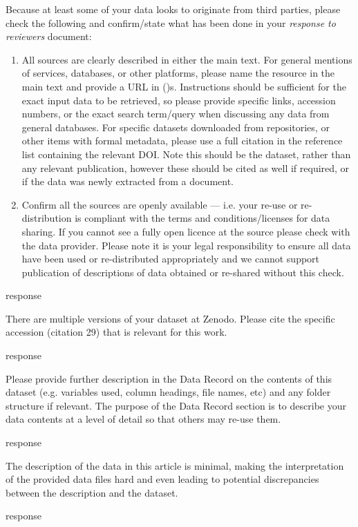 \documentclass{response}
\begin{document}
\EC Because at least some of your data looks to originate from third parties, please check the following and confirm/state what has been done in your \textit{response to reviewers} document:
\begin{enumerate}
    \item All sources are clearly described in either the main text. For general mentions of services, databases, or other platforms, please name the resource in the main text and provide a URL in ()s. Instructions should be sufficient for the exact input data to be retrieved, so please provide specific links, accession numbers, or the exact search term/query when discussing any data from general databases. For specific datasets downloaded from repositories, or other items with formal metadata, please use a full citation in the reference list containing the relevant DOI. Note this should be the dataset, rather than any relevant publication, however these should be cited as well if required, or if the data was newly extracted from a document.
    \item Confirm all the sources are openly available --- i.e. your re-use or re-distribution is compliant with the terms and conditions/licenses for data sharing. If you cannot see a fully open licence at the source please check with the data provider. Please note it is your legal responsibility to ensure all data have been used or re-distributed appropriately and we cannot support publication of descriptions of data obtained or re-shared without this check.
\end{enumerate}

\AR response

\EC There are multiple versions of your dataset at Zenodo. Please cite the specific accession (citation 29) that is relevant for this work.

\AR response

\EC Please provide further description in the Data Record on the contents of this dataset (e.g. variables used, column headings, file names, etc) and any folder structure if relevant. The purpose of the Data Record section is to describe your data contents at a level of detail so that others may re-use them.

\AR response

\EC The description of the data in this article is minimal, making the interpretation of the provided data files hard and even leading to potential discrepancies between the description and the dataset. 

\AR response
\end{document}
